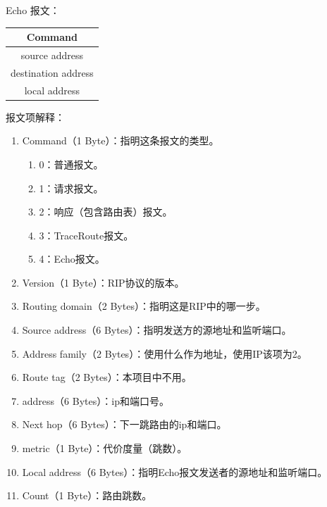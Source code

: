 	\newpage
	Echo 报文：
	\begin{table}[H]
	\centering
		\begin{tabular}{|c|}
			\hline
			Command \\
			\hline
			source address \\
			\hline
			destination address \\
			\hline
			local address \\
			\hline
		\end{tabular}		
	\end{table}
	报文项解释：
	\begin{enumerate}
		\item Command（1 Byte）：指明这条报文的类型。
		\begin{enumerate}[]
			\item 0：普通报文。
			\item 1：请求报文。
			\item 2：响应（包含路由表）报文。
			\item 3：TraceRoute报文。
			\item 4：Echo报文。
		\end{enumerate}
		\item Version（1 Byte）：RIP协议的版本。
		\item Routing domain（2 Bytes）：指明这是RIP中的哪一步。
		\item Source address（6 Bytes）：指明发送方的源地址和监听端口。
		\item Address family（2 Bytes）：使用什么作为地址，使用IP该项为2。
		\item Route tag（2 Bytes）：本项目中不用。
		\item address（6 Bytes）：ip和端口号。
		\item Next hop（6 Bytes）：下一跳路由的ip和端口。
		\item metric（1 Byte）：代价度量（跳数）。
		\item Local address（6 Bytes）：指明Echo报文发送者的源地址和监听端口。
		\item Count（1 Byte）：路由跳数。
	\end{enumerate}
